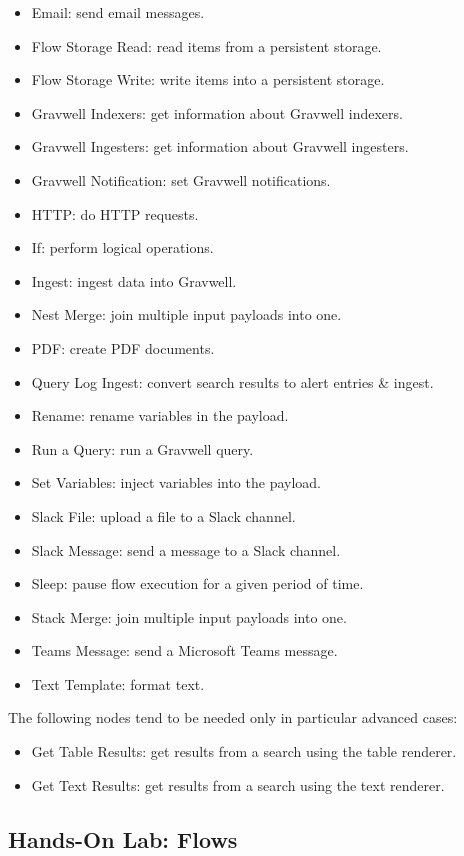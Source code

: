 \begin{itemize}
\item Email: send email messages.
\item Flow Storage Read: read items from a persistent storage.
\item Flow Storage Write: write items into a persistent storage.
\item Gravwell Indexers: get information about Gravwell indexers.
\item Gravwell Ingesters: get information about Gravwell ingesters.
\item Gravwell Notification: set Gravwell notifications.
\item HTTP: do HTTP requests.
\item If: perform logical operations.
\item Ingest: ingest data into Gravwell.
\item Nest Merge: join multiple input payloads into one.
\item PDF: create PDF documents.
\item Query Log Ingest: convert search results to alert entries \& ingest.
\item Rename: rename variables in the payload.
\item Run a Query: run a Gravwell query.
\item Set Variables: inject variables into the payload.
\item Slack File: upload a file to a Slack channel.
\item Slack Message: send a message to a Slack channel.
\item Sleep: pause flow execution for a given period of time.
\item Stack Merge: join multiple input payloads into one.
\item Teams Message: send a Microsoft Teams message.
\item Text Template: format text.
\end{itemize}

The following nodes tend to be needed only in particular advanced cases:

\begin{itemize}
\item Get Table Results: get results from a search using the table renderer.
\item Get Text Results: get results from a search using the text renderer.
\end{itemize}

\subsection{Hands-On Lab: Flows}

